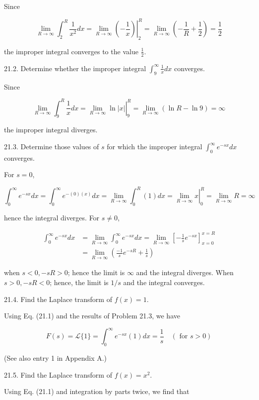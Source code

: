 \documentclass[10pt]{article}
\begin{document}
Since

$$
\lim _{R \rightarrow \infty} \int_{2}^{R} \frac{1}{x^{2}} d x=\left.\lim _{R \rightarrow \infty}\left(-\frac{1}{x}\right)\right|_{2} ^{R}=\lim _{R \rightarrow \infty}\left(-\frac{1}{R}+\frac{1}{2}\right)=\frac{1}{2}
$$

the improper integral converges to the value $\frac{1}{2}$.

21.2. Determine whether the improper integral $\int_{9}^{\infty} \frac{1}{x} d x$ converges.

Since

$$
\lim _{R \rightarrow \infty} \int_{9}^{R} \frac{1}{x} d x=\left.\lim _{R \rightarrow \infty} \ln |x|\right|_{9} ^{R}=\lim _{R \rightarrow \infty}(\ln R-\ln 9)=\infty
$$

the improper integral diverges.

21.3. Determine those values of $s$ for which the improper integral $\int_{0}^{\infty} e^{-s x} d x$ converges.

For $s=0$,

$$
\int_{0}^{\infty} e^{-s x} d x=\int_{0}^{\infty} e^{-(0)(x)} d x=\lim _{R \rightarrow \infty} \int_{0}^{R}(1) d x=\left.\lim _{R \rightarrow \infty} x\right|_{0} ^{R}=\lim _{R \rightarrow \infty} R=\infty
$$

hence the integral diverges. For $s \neq 0$,

$$
\begin{aligned}
\int_{0}^{\infty} e^{-s x} d x & =\lim _{R \rightarrow \infty} \int_{0}^{\infty} e^{-s x} d x=\lim _{R \rightarrow \infty}\left[-\frac{1}{s} e^{-s x}\right]_{x=0}^{x=R} \\
& =\lim _{R \rightarrow \infty}\left(\frac{-1}{s} e^{-s R}+\frac{1}{s}\right)
\end{aligned}
$$

when $s<0,-s R>0$; hence the limit is $\infty$ and the integral diverges. When $s>0,-s R<0$; hence, the limit is $1 / s$ and the integral converges.

21.4. Find the Laplace transform of $f(x)=1$.

Using Eq. (21.1) and the results of Problem 21.3, we have

$$
F(s)=\mathscr{L}\{1\}=\int_{0}^{\infty} e^{-s x}(1) d x=\frac{1}{s} \quad(\text { for } s>0)
$$

(See also entry 1 in Appendix A.)

21.5. Find the Laplace transform of $f(x)=x^{2}$.

Using Eq. (21.1) and integration by parts twice, we find that
\end{document}
